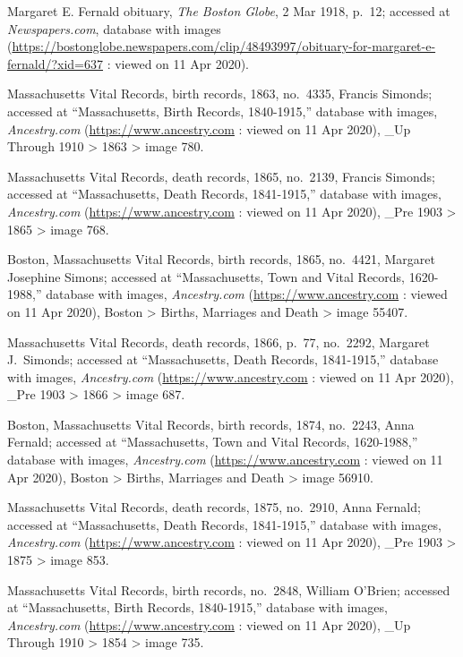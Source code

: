 \begin{thebibliography}{99}
	Margaret E. Fernald obituary, \textit{The Boston Globe}, 2 Mar 1918, p.\ 12; accessed at \textit{Newspapers.com}, database with images (\url{https://bostonglobe.newspapers.com/clip/48493997/obituary-for-margaret-e-fernald/?xid=637} : viewed on 11 Apr 2020).
	
	Massachusetts Vital Records, birth records, 1863, no.\ 4335, Francis Simonds; accessed at ``Massachusetts, Birth Records, 1840-1915,'' database with images, \textit{Ancestry.com} (\url{https://www.ancestry.com} : viewed on 11 Apr 2020), \_Up Through 1910 > 1863 > image 780.
	
	Massachusetts Vital Records, death records, 1865, no.\ 2139, Francis Simonds; accessed at ``Massachusetts, Death Records, 1841-1915,'' database with images, \textit{Ancestry.com} (\url{https://www.ancestry.com} : viewed on 11 Apr 2020), \_Pre 1903 > 1865 > image 768.
	
	Boston, Massachusetts Vital Records, birth records, 1865, no.\ 4421, Margaret Josephine Simons; accessed at ``Massachusetts, Town and Vital Records, 1620-1988,'' database with images, \textit{Ancestry.com} (\url{https://www.ancestry.com} : viewed on 11 Apr 2020), Boston > Births, Marriages and Death > image 55407.
	
	Massachusetts Vital Records, death records, 1866, p.\ 77, no.\ 2292, Margaret J.\ Simonds; accessed at ``Massachusetts, Death Records, 1841-1915,'' database with images, \textit{Ancestry.com} (\url{https://www.ancestry.com} : viewed on 11 Apr 2020), \_Pre 1903 > 1866 > image 687.
	
	Boston, Massachusetts Vital Records, birth records, 1874, no.\ 2243, Anna Fernald; accessed at ``Massachusetts, Town and Vital Records, 1620-1988,'' database with images, \textit{Ancestry.com} (\url{https://www.ancestry.com} : viewed on 11 Apr 2020), Boston > Births, Marriages and Death > image 56910.
	
	Massachusetts Vital Records, death records, 1875, no.\ 2910, Anna Fernald; accessed at ``Massachusetts, Death Records, 1841-1915,'' database with images, \textit{Ancestry.com} (\url{https://www.ancestry.com} : viewed on 11 Apr 2020), \_Pre 1903 > 1875 > image 853.
	
	Massachusetts Vital Records, birth records, no.\ 2848, William O'Brien; accessed at ``Massachusetts, Birth Records, 1840-1915,'' database with images, \textit{Ancestry.com} (\url{https://www.ancestry.com} : viewed on 11 Apr 2020), \_Up Through 1910 > 1854 > image 735.
	

\end{thebibliography}
